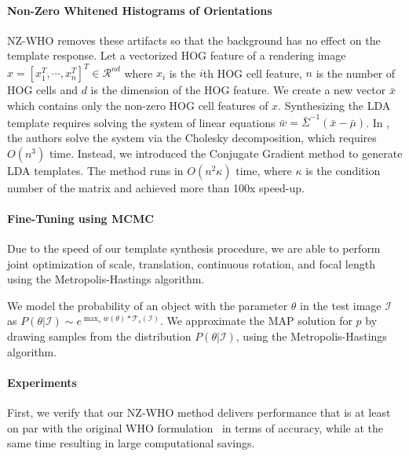 \documentclass[extendedabs]{bmvc2k}
\begin{document}
\vspace{-0.1in}
\paragraph{Non-Zero Whitened Histograms of Orientations}

NZ-WHO removes these artifacts so that the background has no effect on the
template response. Let a vectorized HOG feature of a rendering image $x = [
x_1^T ,  \cdots , x_n^T ]^T \in \mathcal{R}^{nd}$ where $x_i$ is the $i$th HOG cell feature, $n$ is the
number of HOG cells and $d$ is the dimension of the HOG feature. We create a new
vector $\bar{x}$ which contains only the non-zero HOG cell features of $x$.
Synthesizing the LDA template requires solving the system of linear equations
$\bar{w}=\bar{\Sigma}^{-1}(\bar{x} - \bar{\mu})$. In \cite{Hariharan12}, the
authors solve the system via the Cholesky decomposition, which requires
$O(n^3)$ time. Instead, we introduced the Conjugate Gradient method to generate
LDA templates. The method runs in $O(n^2\kappa)$ time, where $\kappa$ is the condition number of the matrix and achieved more than 100x speed-up.


\vspace{-0.1in}
\paragraph{Fine-Tuning using MCMC}
Due to the speed of our template synthesis procedure, we are able to perform
joint optimization of scale, translation, continuous rotation, and focal length
using the Metropolis-Hastings algorithm.

We model the probability of an object with the parameter $\theta$ in the test
image $\mathcal{I}$ as $P(\theta| \mathcal{I}) \sim e^{ \max_{s} w(\theta)
	\ast \mathcal{T}_s(\mathcal{I})}$. We approximate the MAP solution for $p$ by
drawing samples from the distribution $P(\theta | \mathcal{I})$, using the
Metropolis-Hastings algorithm.

\vspace{-0.1in}
\paragraph{Experiments}

First, we verify that our NZ-WHO method delivers performance that is
at least on par with the original WHO formulation~\cite{Hariharan12} in terms of
accuracy, while at the same time resulting in large computational
savings.
\end{document}
